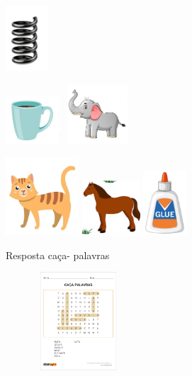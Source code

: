 \includegraphics[width=0.61042in,height=0.95923in]{media/image31.png}

\includegraphics[width=0.78750in,height=0.70972in]{media/image32.png}
\includegraphics[width=1.02361in,height=0.88333in]{media/image33.png}

\includegraphics[width=1.07569in,height=1.14514in]{media/image34.png}
\includegraphics[width=0.85069in,height=0.80069in]{media/image35.png}
\includegraphics[width=0.63333in,height=0.94653in]{media/image36.png}


Resposta caça- palavras

\includegraphics[width=2.13750in,height=1.44792in]{media/image37.jpg}

